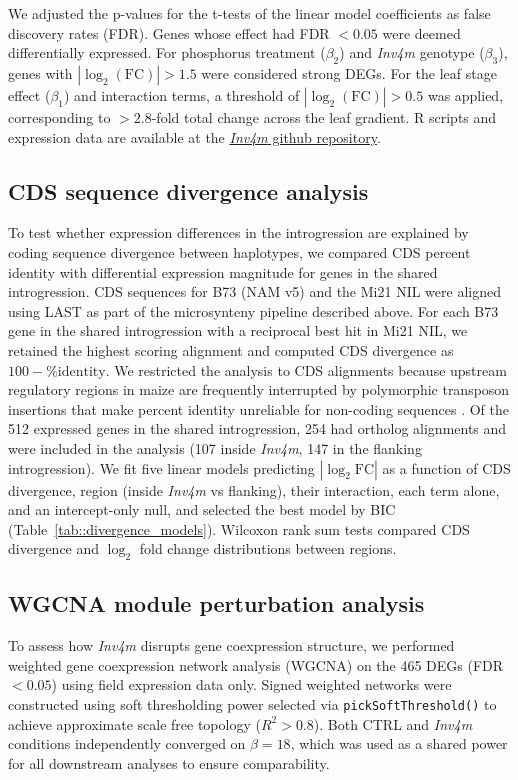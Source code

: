 \documentclass[9pt,twocolumn,twoside]{rilabRxiv}
\newcommand{\invfour}{\textit{Inv4m}\xspace}
\begin{document}
We adjusted the p-values for the t-tests of the linear model coefficients as false discovery rates (FDR).
Genes whose effect had FDR $< 0.05$ were deemed differentially expressed.
For phosphorus treatment ($\beta_2$) and \invfour genotype ($\beta_3$), genes with $|\log_2(\text{FC})| > 1.5$ were considered strong DEGs.
For the leaf stage effect ($\beta_1$) and interaction terms, a threshold of $|\log_2(\text{FC})| > 0.5$ was applied, corresponding to $>2.8$-fold total change across the leaf gradient.
R scripts and expression data are available at the \href{https://github.com/sawers-rellan-labs/inv4m}{\invfour github repository}.

\subsection{CDS sequence divergence analysis}

To test whether expression differences in the introgression are explained by coding sequence divergence between haplotypes, we compared CDS percent identity with differential expression magnitude for genes in the shared introgression.
CDS sequences for B73 (NAM v5) and the Mi21 NIL were aligned using LAST \cite{kielbasa2011} as part of the microsynteny pipeline described above.
For each B73 gene in the shared introgression with a reciprocal best hit in Mi21 NIL, we retained the highest scoring alignment and computed CDS divergence as $100 - \text{\% identity}$.
We restricted the analysis to CDS alignments because upstream regulatory regions in maize are frequently interrupted by polymorphic transposon insertions that make percent identity unreliable for non-coding sequences \cite{liang2022}.
Of the 512 expressed genes in the shared introgression, 254 had ortholog alignments and were included in the analysis (107 inside \invfour, 147 in the flanking introgression).
We fit five linear models predicting $|\log_2\text{FC}|$ as a function of CDS divergence, region (inside \invfour vs flanking), their interaction, each term alone, and an intercept-only null, and selected the best model by BIC (Table~\ref{tab::divergence_models}).
Wilcoxon rank sum tests compared CDS divergence and $\log_2$ fold change distributions between regions.

\subsection{WGCNA module perturbation analysis}

To assess how \invfour disrupts gene coexpression structure, we performed weighted gene coexpression network analysis (WGCNA) \cite{langfelder2008} on the 465 DEGs (FDR $< 0.05$) using field expression data only.
Signed weighted networks were constructed using soft thresholding power selected via \texttt{pickSoftThreshold()} to achieve approximate scale free topology ($R^2 > 0.8$).
Both CTRL and \invfour conditions independently converged on $\beta = 18$, which was used as a shared power for all downstream analyses to ensure comparability.
\end{document}
